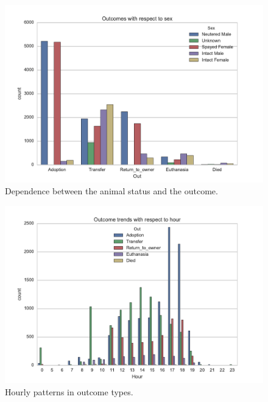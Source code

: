 \documentclass[a4paper,11pt]{article}
\begin{document}
\begin{figure}[t]
\centering
\includegraphics[width=.9\linewidth]{./figure_2}
\caption{Dependence between the animal status and the outcome.}
\label{fig:sex_patterns}
\end{figure}

\begin{figure}[h!]
\centering
\includegraphics[width=.9\linewidth]{./figure_4}
\caption{Hourly patterns in outcome types.}
\label{fig:hourly_patterns}
\end{figure}
\end{document}
